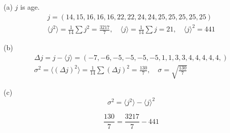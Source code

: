 


\bigskip
(a) $j$ is age.
\begin{gather*}
j=(14,15,16,16,16,22,22,24,24,25,25,25,25,25)
\\
\langle j^2\rangle=\frac{1}{14}\sum j^2=\frac{3217}{7},\quad
\langle j\rangle=\frac{1}{14}\sum j=21,\quad
\langle j\rangle^2=441
\end{gather*}

(b)
\begin{gather*}
\Delta j=j-\langle j\rangle=(-7,-6,-5,-5,-5,-5,1,1,3,3,4,4,4,4,4,)
\\
\sigma^2=\langle(\Delta j)^2\rangle=\frac{1}{14}\sum(\Delta j)^2=\frac{130}{7},\quad\sigma=\sqrt{\frac{130}{7}}
\end{gather*}

(c)
\begin{equation*}
\sigma^2=\langle j^2\rangle-\langle j\rangle^2\tag{1.12}
\end{equation*}

\begin{equation*}
\frac{130}{7}=\frac{3217}{7}-441
\end{equation*}


